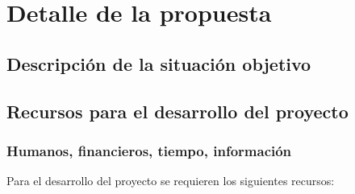 \section{Detalle de la propuesta}
\label{section:propuesta}

\subsection{Descripción de la situación objetivo}
\label{subection:prop:situacion-objetivo}

\Blindtext[1]

\subsection{Recursos para el desarrollo del proyecto}
\label{subsection:prop:recursos}
\subsubsection{Humanos, financieros, tiempo, información}
Para el desarrollo del proyecto se requieren los siguientes recursos:

